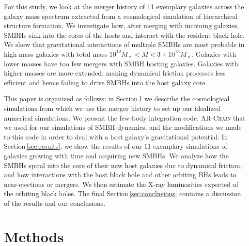 \documentclass[fleqn,usenatbib,useAMS]{mnras}
\begin{document}
For this study, we look at the merger history of 11 exemplary galaxies across the galaxy mass spectrum extracted from a cosmological simulation of hierarchical structure formation. We investigate how, after merging with incoming galaxies, SMBHs sink into the cores of the hosts and interact with the resident black hole. We show that gravitational interactions of multiple SMBHs are most probable in high-mass galaxies with total mass $10^{12} M_{\sun} < M < 3\times10^{13} M_{\sun}$. Galaxies with lower masses have too few mergers with SMBH hosting galaxies. Galaxies with higher masses are more extended, making dynamical friction processes less efficient and hence failing to drive SMBHs into the host galaxy core.

This paper is organized as follows: in Section\,\ref{sec:methods} we describe the cosmological simulations from which we use the merger history to set up our idealized numerical simulations. We present the few-body integration code, \textsc{AR-Chain} that we used for our simulations of SMBH dynamics, and the modifications we made to this code in order to deal with a host galaxy's gravitational potential. In Section\,\ref{sec:results}, we show the results of our 11 exemplary simulations of galaxies growing with time and acquiring new SMBHs. We analyze how the SMBHs spiral into the core of their new host galaxies due to dynamical friction, and how interactions with the host black hole and other orbiting BHs leads to near-ejections or mergers. We then estimate the X-ray luminosities expected of the orbiting black holes.  The final Section\,\ref{sec:conclusions} contains a discussion of the results and our conclusions.

\section{Methods}\label{sec:methods}
\end{document}
